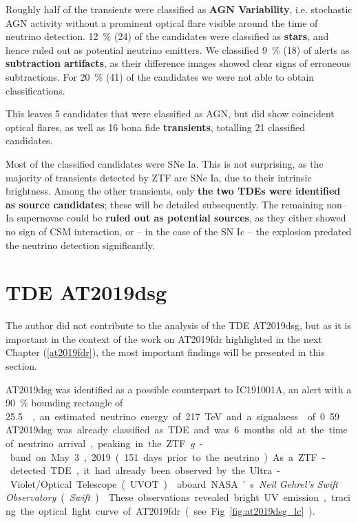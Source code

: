 Roughly half of the transients were classified as \textbf{AGN Variability}, i.e. stochastic AGN activity without a prominent optical flare visible around the time of neutrino detection. \SI{12}{\percent} (24) of the candidates were classified as \textbf{stars}, and hence ruled out as potential neutrino emitters. We classified \SI{9}{\percent} (18) of alerts as \textbf{subtraction artifacts}, as their difference images showed clear signs of erroneous subtractions. For \SI{20}{\percent} (41) of the candidates we were not able to obtain classifications. 

This leaves 5 candidates that were classified as AGN, but did show coincident optical flares, as well as 16 bona fide \textbf{transients}, totalling 21 classified candidates.

Most of the classified candidates were SNe Ia. This is not surprising, as the majority of transients detected by ZTF are SNe Ia, due to their intrinsic brightness. Among the other transients, only \textbf{the two TDEs were identified as source candidates}; these will be detailed subsequently. The remaining non--Ia supernovae could be \textbf{ruled out as potential sources}, as they either showed no sign of CSM interaction, or -- in the case of the SN Ic -- the explosion predated the neutrino detection significantly.

\section{TDE AT2019dsg}
The author did not contribute to the analysis of the TDE AT2019dsg, but as it is important in the context of the work on AT2019fdr highlighted in the next Chapter (\ref{at2019fdr}), the most important findings will be presented in this section.

AT2019dsg was identified as a possible counterpart to IC191001A, an alert with a \SI{90}{\percent} bounding rectangle of \SI{25.5}{\square\deg}, an estimated neutrino energy of \SI{217}{\tera\eV} and a signalness of 0.59 .

AT2019dsg was already classified as TDE and was 6 months old at the time of neutrino arrival, peaking in the ZTF \textit{g}-band on May 3, 2019 (151 days prior to the neutrino). As a ZTF-detected TDE, it had already been observed by the Ultra-Violet/Optical Telescope (UVOT)  aboard NASA's \textit{Neil Gehrel's Swift Observatory} (\textit{Swift}) . These observations revealed bright UV emission, tracing the optical light curve of AT2019fdr (see Fig. \ref{fig:at2019dsg_lc}).

